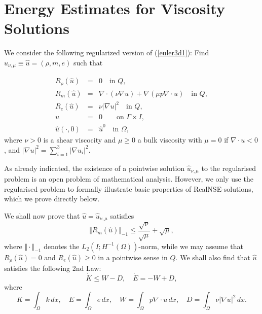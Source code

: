 \section{Energy Estimates for Viscosity Solutions}


We consider the following regularized version
of (\ref{euler3d1}): Find $\hat u_{\nu ,\mu}\equiv\hat u=(\rho ,m,e)$ such that

\begin{equation}\label{euler3dreg}
\begin{array}{rcl}
R_\rho (\hat u)&=&  0 \quad \mbox{in } Q, \\
R_m (\hat u)&=&\nabla\cdot (\nu\nabla u) +
\nabla (\mu p\nabla\cdot u) \quad \mbox{in } Q, \\
R_e (\hat u) &=&  \nu \vert\nabla u\vert^2 \quad \mbox{in } Q, \\
u &=&0\quad  \quad\mbox{on } \Gamma\times I,\\
\hat u(\cdot ,0)&=&\hat u^0\quad \mbox{in } \Omega , 
\end{array} 
\end{equation}
where $\nu >0$ is a  shear viscocity and $\mu\ge 0$ 
a bulk viscosity with $\mu =0$ if $\nabla\cdot u <0$, and 
$\vert\nabla u\vert^2 =\sum_{i=1}^3\vert\nabla u_i\vert^2$. 

As already indicated, the existence of a pointwise solution 
$\hat u_{\nu ,\mu}$ to the regularised
problem is an open problem of mathematical analysis.
However, we only use the regularised problem to formally illustrate basic
properties of RealNSE-solutions, which we prove directly below.



We shall now prove that $\hat u=\hat u_{\nu ,\mu}$ satisfies
\begin{equation}\label{euler1dweak}
\Vert R_m(\hat u)\Vert_{-1}\le 
\frac{\sqrt{\nu}}{\sqrt{\mu}}+\sqrt{\mu},
\end{equation}
where $\Vert\cdot\Vert_{-1}$ denotes the $L_2(I;H^{-1}(\Omega ))$-norm,
while we may assume that $R_\rho (\hat u)=0$ and $R_e(\hat u)\ge 0$ in a pointwise sense
in $Q$. We shall also find that $\hat u$ satisfies the following 
2nd Law:
\[
\dot K \le W-D,\quad \dot E =-W+D,
\]
where 
\[
K=\int_\Omega k\, dx,\quad E=\int_\Omega e\, dx, \quad W
=\int_\Omega p\nabla\cdot u\, dx, 
\quad D =\int_\Omega \nu \vert\nabla u\vert^2\, dx.
\]

